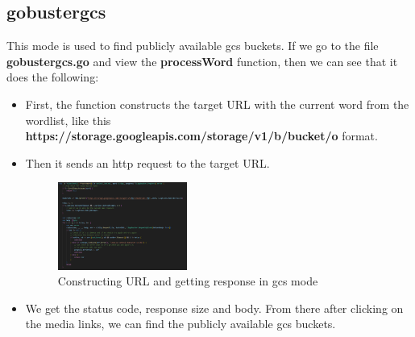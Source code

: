 \documentclass[12 pt]{article}
\begin{document}
\subsection{gobustergcs}
This mode is used to find publicly available gcs buckets. If we go to the file \textbf{gobustergcs.go} and view the \textbf{processWord} function, then we can see that it does the following:
\begin{itemize}
    \item First, the function constructs the target URL with the current word from the wordlist, like this \textbf{https://storage.googleapis.com/storage/v1/b/bucket/o} format.
    \item Then it sends an http request to the target URL.
    \begin{figure}[H]
        \centering
        \includegraphics[width=0.4\textwidth]{Gobustergcs_processWord.png}
        \caption{Constructing URL and getting response in gcs mode}
        \label{fig: Gobustergcs processWord}
    \end{figure}
    \item We get the status code, response size and body. From there after clicking on the media links, we can find the publicly available gcs buckets.
\end{itemize}
\end{document}
